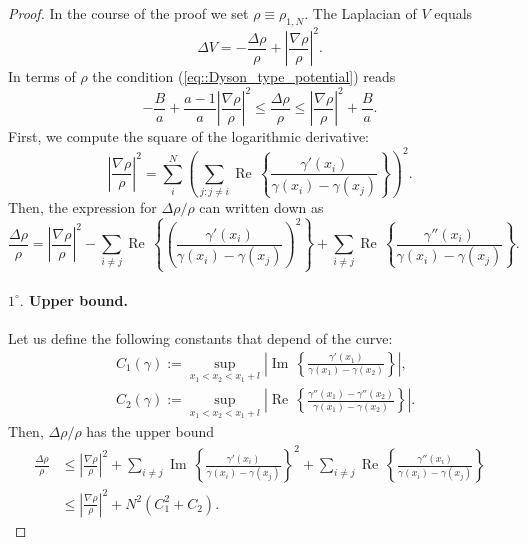 \documentclass[11pt]{article}
\renewcommand{\Re}{\operatorname{Re}\,}
\renewcommand{\Im}{\operatorname{Im}\,}
\numberwithin{equation}{section}
\theoremstyle{definition}
\begin{document}
\begin{proof} 
In the course of the proof we set $\rho\equiv\rho_{1,N}$. The Laplacian of $V$ equals
\[
    \Delta V = - \frac{\Delta \rho}{\rho } + \left|\frac{\nabla \rho}{\rho}\right|^{2}.
\]
In terms of $\rho$ the condition (\ref{eq::Dyson_type_potential}) reads
\[
    -\frac{B}{a} + \frac{a-1}{a}\left|\frac{\nabla\rho}{\rho}\right|^{2}\le \frac{\Delta\rho}{\rho}\le \left|\frac{\nabla\rho}{\rho}\right|^{2} + \frac{B}{a}.
\]
First, we compute the square of the logarithmic derivative:
\[
    \left|\frac{\nabla\rho}{\rho}\right|^2 
    = \sum\limits_{i}^{N}\left(\sum\limits_{j:j\neq i}\Re\left\{\frac{\gamma'(x_{i})}{\gamma(x_{i})-\gamma(x_{j})}\right\}\right)^2.
\]
Then, the expression for $\Delta \rho/\rho$ can written down as 
\[
    \frac{\Delta\rho}{\rho} 
    = \left|\frac{\nabla\rho}{\rho}\right|^2
    -  \sum\limits_{i\neq j}\Re\left\{\left(\frac{\gamma'(x_{i})}{\gamma(x_{i})-\gamma(x_{j})}\right)^{2}\right\}
    + \sum\limits_{i\neq j}\Re\left\{\frac{\gamma''(x_{i})}{\gamma(x_{i})-\gamma(x_{j})} \right\}.
\]
\paragraph{$1^{\circ}.$ Upper bound.} Let us define the following constants that depend of the curve:
\begin{align*}
    &C_{1}(\gamma) := \sup\limits_{x_{1}<x_{2}<x_{1}+l}\left|\Im\left\{\frac{\gamma'(x_{1})}{\gamma(x_{1})-\gamma(x_{2})}\right\}\right|,\\
    &C_{2}(\gamma) :=\sup\limits_{x_{1}<x_{2}<x_{1}+l}\left|\Re\left\{\frac{\gamma''(x_{1})-\gamma''(x_{2})}{\gamma(x_{1})-\gamma(x_{2})} \right\}\right|.
\end{align*}
Then, $\Delta\rho/\rho$ has the upper bound 
\begin{align*}
    \frac{\Delta\rho}{\rho} 
    &\le \left|\frac{\nabla\rho}{\rho}\right|^2
    +  \sum\limits_{i\neq j}\Im\left\{\frac{\gamma'(x_{i})}{\gamma(x_{i})-\gamma(x_{j})}\right\}^{2}
    + \sum\limits_{i\neq j}\Re\left\{\frac{\gamma''(x_{i})}{\gamma(x_{i})-\gamma(x_{j})} \right\}\\
    &\le \left|\frac{\nabla\rho}{\rho}\right|^2 + N^{2}(C_{1}^{2} +C_{2}).
\end{align*}

\end{proof}
\end{document}
